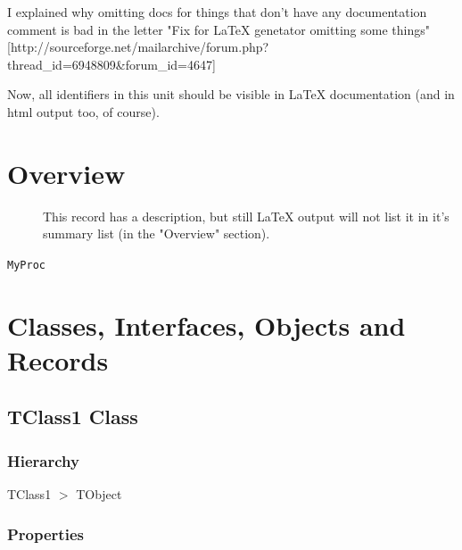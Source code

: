 \documentclass{report}
\begin{document}
I explained why omitting docs for things that don't have any documentation comment is bad in the letter "Fix for LaTeX genetator omitting some things" [http://sourceforge.net/mailarchive/forum.php?thread{\_}id=6948809{\&}forum{\_}id=4647]

Now, all identifiers in this unit should be visible in LaTeX documentation (and in html output too, of course).
\section{Overview}
\begin{description}
\item[\texttt{\begin{ttfamily}TClass1\end{ttfamily} Class}]
\item[\texttt{\begin{ttfamily}TMyRecord\end{ttfamily} Record}]
\item[\texttt{\begin{ttfamily}TMyRecord2\end{ttfamily} Record}]This record has a description, but still LaTeX output will not list it in it's summary list (in the "Overview" section).
\item[\texttt{\begin{ttfamily}TMyRecord3\end{ttfamily} Record}]
\end{description}
\begin{description}
\item[\texttt{MyProc}]
\end{description}
\section{Classes, Interfaces, Objects and Records}
\subsection*{TClass1 Class}
\subsubsection*{\large{\textbf{Hierarchy}}\normalsize\hspace{1ex}\hfill}
TClass1 {$>$} TObject
\subsubsection*{\large{\textbf{Properties}}\normalsize\hspace{1ex}\hfill}
\end{document}
